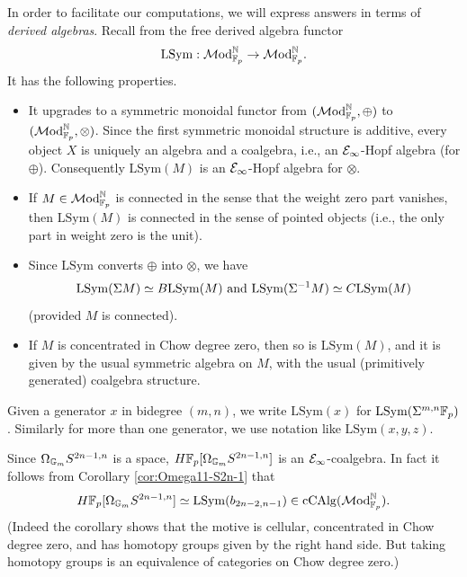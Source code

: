 \documentclass{amsart}
\numberwithin{proposition}{section}
\numberwithin{equation}{section}
\def\LSym{\mathrm{LSym}}
\def\cCAlg{\mathrm{cCAlg}}
\begin{document}
In order to facilitate our computations, we will express answers in terms of \emph{derived algebras}.
Recall from \cite[\S4.2]{raksit2020hochschild} the free derived algebra functor \[ \LSym: \Mod_{\F_p}^\N \to \Mod_{\F_p}^\N. \]
It has the following properties.
\begin{itemize}
\item It upgrades to a symmetric monoidal functor from $(\mathcal{M}\mathrm{od}_{\mathbb{F}_p}^{\mathbb{N}}, \oplus)$ to $(\mathcal{M}\mathrm{od}_{\mathbb{F}_p}^{\mathbb{N}}, \otimes)$.
  Since the first symmetric monoidal structure is additive, every object $X$ is uniquely an algebra and a coalgebra, i.e., an $\mathcal E_\infty$-Hopf algebra (for $\oplus$).
  Consequently $\LSym(M)$ is an $\mathcal E_\infty$-Hopf algebra for $\otimes$.
\item If $M \in \mathcal{M}\mathrm{od}_{\mathbb{F}_p}^{\mathbb{N}}$ is connected in the sense that the weight zero part vanishes, then $\LSym(M)$ is connected in the sense of pointed objects (i.e., the only part in weight zero is the unit).
\item Since $\LSym$ converts $\oplus$ into $\otimes$, we have \begin{equation} \label{eq:LSym-CB} \LSym(\Sigma M) \wequi B\LSym(M) \text{ and } \LSym(\Sigma^{-1} M) \wequi C\LSym(M) \end{equation} (provided $M$ is connected).
\item If $M$ is concentrated in Chow degree zero, then so is $\LSym(M)$, and it is given by the usual symmetric algebra on $M$, with the usual (primitively generated) coalgebra structure.
\end{itemize}

\begin{remark}
Given a generator $x$ in bidegree $(m,n)$, we write $\LSym(x)$ for $\LSym(\Sigma^{m,n}\F_p)$.
Similarly for more than one generator, we use notation like $\LSym(x,y,z)$.
\end{remark}

\begin{example} \label{ex:OmegaGmS2n-1}
Since $\Omega_{\mathbb{G}_m} S^{2n-1,n}$ is a space, $H\mathbb{F}_p[\Omega_{\mathbb{G}_m} S^{2n-1,n}]$ is an $\mathcal E_\infty$-coalgebra.
In fact it follows from Corollary \ref{cor:Omega11-S2n-1} that \[ H\F_p[\Omega_\Gm S^{2n-1,n}] \wequi \LSym(b_{2n-2,n-1}) \in \cCAlg(\Mod_{\F_p}^\N). \]
(Indeed the corollary shows that the motive is cellular, concentrated in Chow degree zero, and has homotopy groups given by the right hand side.
But taking homotopy groups is an equivalence of categories on Chow degree zero.)
\end{example}
\end{document}
